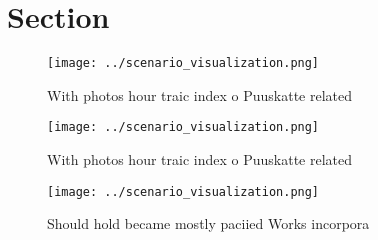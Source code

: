 \documentclass[a4paper]{article}
\begin{document}
\section{Section}

\begin{figure}
\centering
\texttt{[image: ../scenario\_visualization.png]}
\caption{With photos hour traic index o Puuskatte related 
}
\end{figure}
 
\begin{figure}
\centering
\texttt{[image: ../scenario\_visualization.png]}
\caption{With photos hour traic index o Puuskatte related 
}
\end{figure}
 
\begin{figure}
\centering
\texttt{[image: ../scenario\_visualization.png]}
\caption{Should hold became mostly paciied Works incorpora
}
\end{figure}
 
\end{document}

